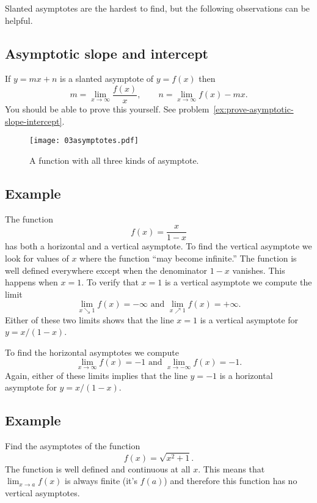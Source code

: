 Slanted asymptotes are the hardest to find, but the following
observations can be helpful.  

\subsection{Asymptotic slope and intercept} 
If $y=mx+n$ is a slanted asymptote of $y=f(x)$ then
\begin{equation}
  m = \lim_{x\to\infty} \frac{f(x)}{x}, \qquad
  n = \lim_{x\to\infty} f(x) - mx.
  \label{eq:03asymptotic-slope-intercept}
\end{equation}
You should be able to prove this yourself. See
problem~\ref{ex:prove-asymptotic-slope-intercept}.

\begin{figure}[bt]
  \texttt{[image: 03asymptotes.pdf]}
  \caption{A function with all three kinds of asymptote. }
  \label{fig:03asymptotes}
\end{figure}

\subsection{Example} 
The function
\[
f(x) = \dfrac x{1-x}
\]
has both a horizontal and a vertical asymptote.  To find the
vertical asymptote we look for values of $x$ where the function
``may become infinite.'' The function is well defined everywhere
except when the denominator $1-x$ vanishes.  This happens when $x=1$.
To verify that $x=1$ is a vertical asymptote we compute the limit
\[
\lim_{x\searrow1} f(x) = -\infty \text { and }
\lim_{x\nearrow1} f(x) = +\infty.
\]
Either of these two limits shows that the line $x=1$ is a vertical
asymptote for $y= x/(1-x)$.

To find the horizontal asymptotes we compute
\[
\lim_{x\to\infty} f(x) = -1
\text{ and }
\lim_{x\to-\infty} f(x) = -1.
\]
Again, either of these limits implies that the line $y=-1$ is a
horizontal asymptote for $y=x/(1-x)$.

\subsection{Example} 
Find the asymptotes of the function
\[
f(x) = \sqrt{x^2+1}.
\]
The function is well defined and continuous at all $x$.  This means
that $\lim_{x\to a} f(x)$ is always finite (it's $f(a)$) and therefore
this function has no vertical asymptotes.

